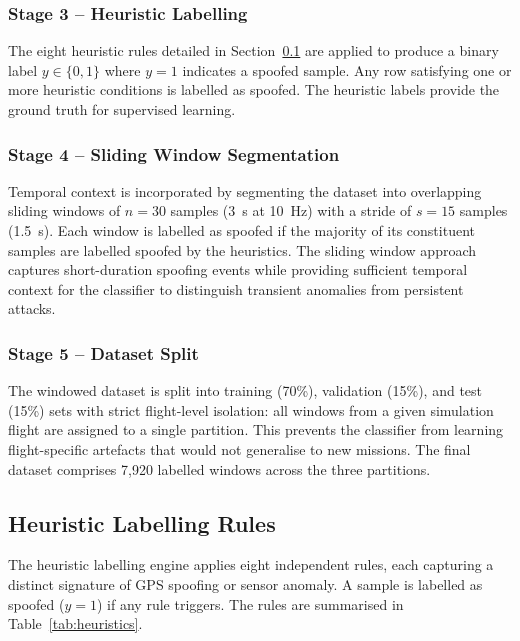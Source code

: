 \documentclass[electronics,article,accept,moreauthors]{Definitions/mdpi}
\begin{document}
\subsubsection{Stage 3 -- Heuristic Labelling}
The eight heuristic rules detailed in Section~\ref{sec:heuristics} are applied to produce a binary label $y \in \{0, 1\}$ where $y = 1$ indicates a spoofed sample. Any row satisfying one or more heuristic conditions is labelled as spoofed. The heuristic labels provide the ground truth for supervised learning.

\subsubsection{Stage 4 -- Sliding Window Segmentation}
Temporal context is incorporated by segmenting the dataset into overlapping sliding windows of $n = 30$ samples (3~s at 10~Hz) with a stride of $s = 15$ samples (1.5~s). Each window is labelled as spoofed if the majority of its constituent samples are labelled spoofed by the heuristics. The sliding window approach captures short-duration spoofing events while providing sufficient temporal context for the classifier to distinguish transient anomalies from persistent attacks.

\subsubsection{Stage 5 -- Dataset Split}
The windowed dataset is split into training (70\%), validation (15\%), and test (15\%) sets with strict flight-level isolation: all windows from a given simulation flight are assigned to a single partition. This prevents the classifier from learning flight-specific artefacts that would not generalise to new missions. The final dataset comprises 7,920 labelled windows across the three partitions.

\subsection{Heuristic Labelling Rules}
\label{sec:heuristics}

The heuristic labelling engine applies eight independent rules, each capturing a distinct signature of GPS spoofing or sensor anomaly. A sample is labelled as spoofed ($y = 1$) if any rule triggers. The rules are summarised in Table~\ref{tab:heuristics}.
\end{document}
